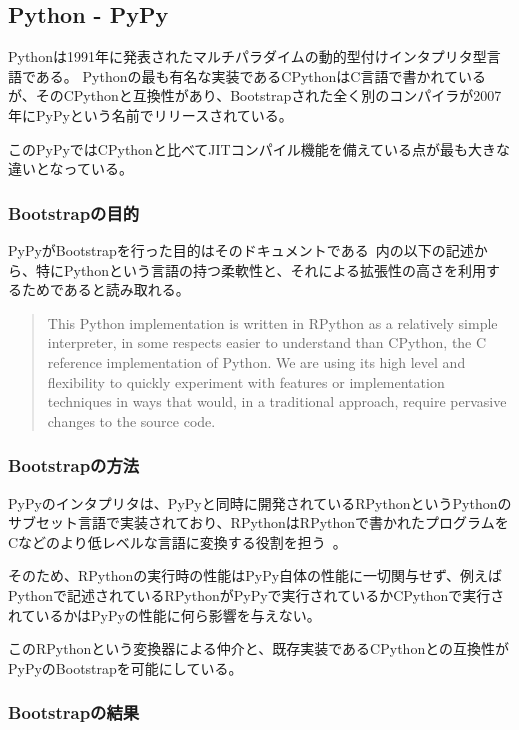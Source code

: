 \subsection{Python - PyPy}
\label{explain-bootstrap:instance:python}

Pythonは1991年に発表されたマルチパラダイムの動的型付けインタプリタ型言語である。
Pythonの最も有名な実装であるCPythonはC言語で書かれているが、そのCPythonと互換性があり、Bootstrapされた全く別のコンパイラが2007年にPyPyという名前でリリースされている。

このPyPyではCPythonと比べてJITコンパイル機能を備えている点が最も大きな違いとなっている。

\subsubsection{Bootstrapの目的}

PyPyがBootstrapを行った目的はそのドキュメントである~\cite{pypy-doc}内の以下の記述から、特にPythonという言語の持つ柔軟性と、それによる拡張性の高さを利用するためであると読み取れる。

\begin{quotation}
This Python implementation is written in RPython as a relatively simple interpreter, in some respects easier to understand than CPython, the C reference implementation of Python. We are using its high level and flexibility to quickly experiment with features or implementation techniques in ways that would, in a traditional approach, require pervasive changes to the source code.
\end{quotation}


\subsubsection{Bootstrapの方法}

PyPyのインタプリタは、PyPyと同時に開発されているRPythonというPythonのサブセット言語で実装されており、RPythonはRPythonで書かれたプログラムをCなどのより低レベルな言語に変換する役割を担う~\cite{rpython-doc}。

そのため、RPythonの実行時の性能はPyPy自体の性能に一切関与せず、例えばPythonで記述されているRPythonがPyPyで実行されているかCPythonで実行されているかはPyPyの性能に何ら影響を与えない。

このRPythonという変換器による仲介と、既存実装であるCPythonとの互換性がPyPyのBootstrapを可能にしている。


\subsubsection{Bootstrapの結果}

